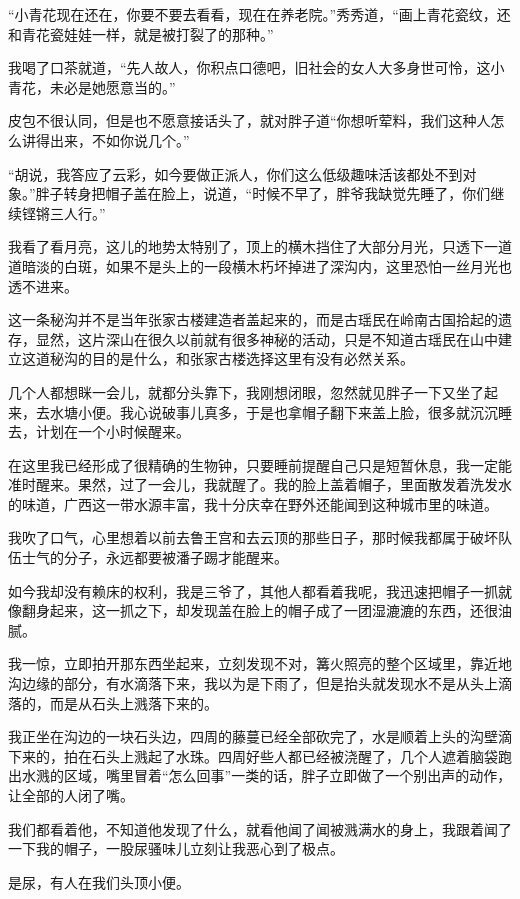 “小青花现在还在，你要不要去看看，现在在养老院。”秀秀道，“画上青花瓷纹，还和青花瓷娃娃一样，就是被打裂了的那种。”

我喝了口茶就道，“先人故人，你积点口德吧，旧社会的女人大多身世可怜，这小青花，未必是她愿意当的。”

皮包不很认同，但是也不愿意接话头了，就对胖子道“你想听荤料，我们这种人怎么讲得出来，不如你说几个。”

“胡说，我答应了云彩，如今要做正派人，你们这么低级趣味活该都处不到对象。”胖子转身把帽子盖在脸上，说道，“时候不早了，胖爷我缺觉先睡了，你们继续铿锵三人行。”

我看了看月亮，这儿的地势太特别了，顶上的横木挡住了大部分月光，只透下一道道暗淡的白斑，如果不是头上的一段横木朽坏掉进了深沟内，这里恐怕一丝月光也透不进来。

这一条秘沟并不是当年张家古楼建造者盖起来的，而是古瑶民在岭南古国拾起的遗存，显然，这片深山在很久以前就有很多神秘的活动，只是不知道古瑶民在山中建立这道秘沟的目的是什么，和张家古楼选择这里有没有必然关系。

几个人都想眯一会儿，就都分头靠下，我刚想闭眼，忽然就见胖子一下又坐了起来，去水塘小便。我心说破事儿真多，于是也拿帽子翻下来盖上脸，很多就沉沉睡去，计划在一个小时候醒来。

在这里我已经形成了很精确的生物钟，只要睡前提醒自己只是短暂休息，我一定能准时醒来。果然，过了一会儿，我就醒了。我的脸上盖着帽子，里面散发着洗发水的味道，广西这一带水源丰富，我十分庆幸在野外还能闻到这种城市里的味道。

我吹了口气，心里想着以前去鲁王宫和去云顶的那些日子，那时候我都属于破坏队伍士气的分子，永远都要被潘子踢才能醒来。

如今我却没有赖床的权利，我是三爷了，其他人都看着我呢，我迅速把帽子一抓就像翻身起来，这一抓之下，却发现盖在脸上的帽子成了一团湿漉漉的东西，还很油腻。

我一惊，立即拍开那东西坐起来，立刻发现不对，篝火照亮的整个区域里，靠近地沟边缘的部分，有水滴落下来，我以为是下雨了，但是抬头就发现水不是从头上滴落的，而是从石头上溅落下来的。

我正坐在沟边的一块石头边，四周的藤蔓已经全部砍完了，水是顺着上头的沟壁滴下来的，拍在石头上溅起了水珠。四周好些人都已经被浇醒了，几个人遮着脑袋跑出水溅的区域，嘴里冒着“怎么回事”一类的话，胖子立即做了一个别出声的动作，让全部的人闭了嘴。

我们都看着他，不知道他发现了什么，就看他闻了闻被溅满水的身上，我跟着闻了一下我的帽子，一股尿骚味儿立刻让我恶心到了极点。

是尿，有人在我们头顶小便。

